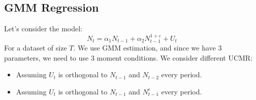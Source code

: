     \subsection{GMM Regression}
    Let's consider the model:
    \begin{equation}
        N_{t} = \alpha_1 N_{t-1} + \alpha_2 N_{t-1}^{1 + \varepsilon} + U_t\label{eq:equation1}
    \end{equation}
    For a dataset of size $T$. We use GMM estimation, and since we have $3$ parameters, we need to use 3 moment conditions. We consider different UCMR:
    \begin{itemize}
        \item Assuming $U_t$ is orthogonal to $N_{t-1}$ and $N_{t-2}$ every period.
        \item Assuming $U_t$ is orthogonal to $N_{t-1}$ and $N^{\epsilon}_{t-1}$ every period.
    \end{itemize}

